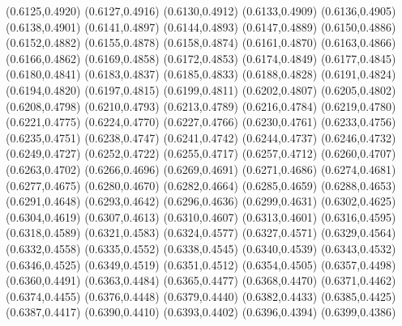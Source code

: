 \PST@Cross(0.6125,0.4920)
\PST@Cross(0.6127,0.4916)
\PST@Cross(0.6130,0.4912)
\PST@Cross(0.6133,0.4909)
\PST@Cross(0.6136,0.4905)
\PST@Cross(0.6138,0.4901)
\PST@Cross(0.6141,0.4897)
\PST@Cross(0.6144,0.4893)
\PST@Cross(0.6147,0.4889)
\PST@Cross(0.6150,0.4886)
\PST@Cross(0.6152,0.4882)
\PST@Cross(0.6155,0.4878)
\PST@Cross(0.6158,0.4874)
\PST@Cross(0.6161,0.4870)
\PST@Cross(0.6163,0.4866)
\PST@Cross(0.6166,0.4862)
\PST@Cross(0.6169,0.4858)
\PST@Cross(0.6172,0.4853)
\PST@Cross(0.6174,0.4849)
\PST@Cross(0.6177,0.4845)
\PST@Cross(0.6180,0.4841)
\PST@Cross(0.6183,0.4837)
\PST@Cross(0.6185,0.4833)
\PST@Cross(0.6188,0.4828)
\PST@Cross(0.6191,0.4824)
\PST@Cross(0.6194,0.4820)
\PST@Cross(0.6197,0.4815)
\PST@Cross(0.6199,0.4811)
\PST@Cross(0.6202,0.4807)
\PST@Cross(0.6205,0.4802)
\PST@Cross(0.6208,0.4798)
\PST@Cross(0.6210,0.4793)
\PST@Cross(0.6213,0.4789)
\PST@Cross(0.6216,0.4784)
\PST@Cross(0.6219,0.4780)
\PST@Cross(0.6221,0.4775)
\PST@Cross(0.6224,0.4770)
\PST@Cross(0.6227,0.4766)
\PST@Cross(0.6230,0.4761)
\PST@Cross(0.6233,0.4756)
\PST@Cross(0.6235,0.4751)
\PST@Cross(0.6238,0.4747)
\PST@Cross(0.6241,0.4742)
\PST@Cross(0.6244,0.4737)
\PST@Cross(0.6246,0.4732)
\PST@Cross(0.6249,0.4727)
\PST@Cross(0.6252,0.4722)
\PST@Cross(0.6255,0.4717)
\PST@Cross(0.6257,0.4712)
\PST@Cross(0.6260,0.4707)
\PST@Cross(0.6263,0.4702)
\PST@Cross(0.6266,0.4696)
\PST@Cross(0.6269,0.4691)
\PST@Cross(0.6271,0.4686)
\PST@Cross(0.6274,0.4681)
\PST@Cross(0.6277,0.4675)
\PST@Cross(0.6280,0.4670)
\PST@Cross(0.6282,0.4664)
\PST@Cross(0.6285,0.4659)
\PST@Cross(0.6288,0.4653)
\PST@Cross(0.6291,0.4648)
\PST@Cross(0.6293,0.4642)
\PST@Cross(0.6296,0.4636)
\PST@Cross(0.6299,0.4631)
\PST@Cross(0.6302,0.4625)
\PST@Cross(0.6304,0.4619)
\PST@Cross(0.6307,0.4613)
\PST@Cross(0.6310,0.4607)
\PST@Cross(0.6313,0.4601)
\PST@Cross(0.6316,0.4595)
\PST@Cross(0.6318,0.4589)
\PST@Cross(0.6321,0.4583)
\PST@Cross(0.6324,0.4577)
\PST@Cross(0.6327,0.4571)
\PST@Cross(0.6329,0.4564)
\PST@Cross(0.6332,0.4558)
\PST@Cross(0.6335,0.4552)
\PST@Cross(0.6338,0.4545)
\PST@Cross(0.6340,0.4539)
\PST@Cross(0.6343,0.4532)
\PST@Cross(0.6346,0.4525)
\PST@Cross(0.6349,0.4519)
\PST@Cross(0.6351,0.4512)
\PST@Cross(0.6354,0.4505)
\PST@Cross(0.6357,0.4498)
\PST@Cross(0.6360,0.4491)
\PST@Cross(0.6363,0.4484)
\PST@Cross(0.6365,0.4477)
\PST@Cross(0.6368,0.4470)
\PST@Cross(0.6371,0.4462)
\PST@Cross(0.6374,0.4455)
\PST@Cross(0.6376,0.4448)
\PST@Cross(0.6379,0.4440)
\PST@Cross(0.6382,0.4433)
\PST@Cross(0.6385,0.4425)
\PST@Cross(0.6387,0.4417)
\PST@Cross(0.6390,0.4410)
\PST@Cross(0.6393,0.4402)
\PST@Cross(0.6396,0.4394)
\PST@Cross(0.6399,0.4386)
